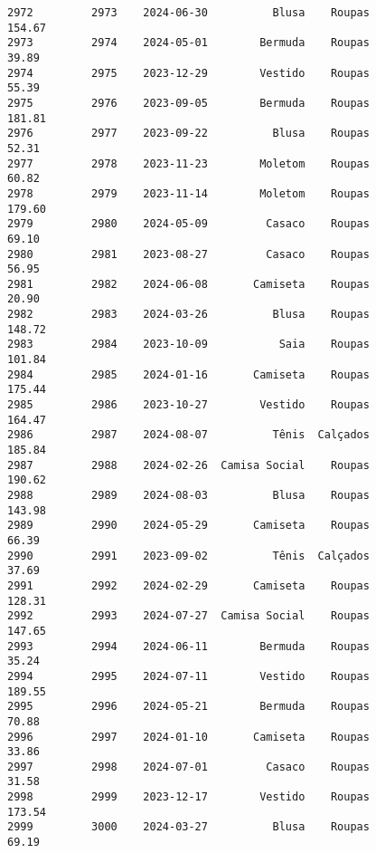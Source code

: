 \documentclass[11pt]{article}
\begin{document}
\begin{Verbatim}[commandchars=\\\{\}]
2972         2973    2024-06-30          Blusa    Roupas          154.67   
2973         2974    2024-05-01        Bermuda    Roupas           39.89   
2974         2975    2023-12-29        Vestido    Roupas           55.39   
2975         2976    2023-09-05        Bermuda    Roupas          181.81   
2976         2977    2023-09-22          Blusa    Roupas           52.31   
2977         2978    2023-11-23        Moletom    Roupas           60.82   
2978         2979    2023-11-14        Moletom    Roupas          179.60   
2979         2980    2024-05-09         Casaco    Roupas           69.10   
2980         2981    2023-08-27         Casaco    Roupas           56.95   
2981         2982    2024-06-08       Camiseta    Roupas           20.90   
2982         2983    2024-03-26          Blusa    Roupas          148.72   
2983         2984    2023-10-09           Saia    Roupas          101.84   
2984         2985    2024-01-16       Camiseta    Roupas          175.44   
2985         2986    2023-10-27        Vestido    Roupas          164.47   
2986         2987    2024-08-07          Tênis  Calçados          185.84   
2987         2988    2024-02-26  Camisa Social    Roupas          190.62   
2988         2989    2024-08-03          Blusa    Roupas          143.98   
2989         2990    2024-05-29       Camiseta    Roupas           66.39   
2990         2991    2023-09-02          Tênis  Calçados           37.69   
2991         2992    2024-02-29       Camiseta    Roupas          128.31   
2992         2993    2024-07-27  Camisa Social    Roupas          147.65   
2993         2994    2024-06-11        Bermuda    Roupas           35.24   
2994         2995    2024-07-11        Vestido    Roupas          189.55   
2995         2996    2024-05-21        Bermuda    Roupas           70.88   
2996         2997    2024-01-10       Camiseta    Roupas           33.86   
2997         2998    2024-07-01         Casaco    Roupas           31.58   
2998         2999    2023-12-17        Vestido    Roupas          173.54   
2999         3000    2024-03-27          Blusa    Roupas           69.19   


\end{Verbatim}
\end{document}
